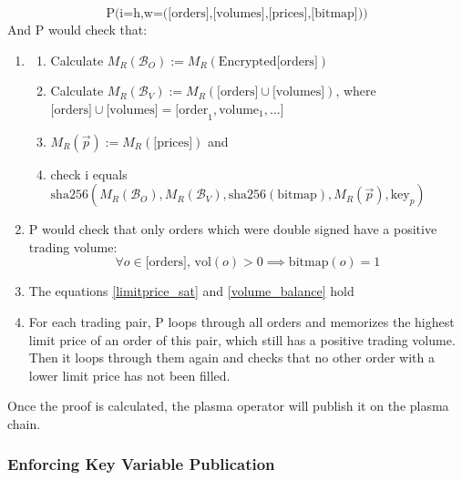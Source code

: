 \documentclass[11pt,parskip=full]{scrartcl}%
\begin{document}
\begin{equation}
\text{P(i=h,}
\text{w=([orders],[volumes],[prices],[bitmap]))} 
\end{equation}
And P would check that:
\begin{enumerate}
\item  \begin{enumerate}
  \item Calculate $M_R(\mathcal{B}_O) := M_R(\text{Encrypted[orders]})$
    \item Calculate  $M_R(\mathcal{B}_V) := M_R(\text{[orders]} \cup \text{[volumes]})$,\newline
where $\text{[orders]} \cup \text{[volumes]} = \text{[order}_1, \text{volume}_1, ...] $
  \item $M_R(\vec{p}) := M_R(\text{[prices]})$ and
    \item check i equals $ \text{sha256}(M_R(\mathcal{B}_O),M_R(\mathcal{B}_V), \text{sha256}(\text{bitmap}), M_R(\vec{p}), \text{key}_p) $
    \end{enumerate}
\item P would check that only orders which were double signed have a positive trading volume:
\begin{equation}
\forall o \in \text{[orders], vol}(o)>0 \implies \text{bitmap}(o) = 1 
\end{equation}
\item The equations \ref{limitprice_sat} and \ref{volume_balance} hold
\item For each trading pair, P loops through all orders and memorizes the highest limit price of an order of this pair, which still has a positive trading volume. 
Then it loops through them again and checks that no other order with a lower limit price has not been filled. 
\end{enumerate}

Once the proof is calculated, the plasma operator will publish it on the plasma chain. 


\subsubsection{Enforcing Key Variable Publication}
\end{document}
